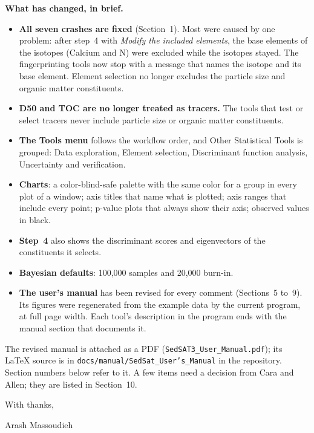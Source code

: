 \documentclass[11pt]{article}
\newcommand{\code}[1]{\texttt{#1}}
\begin{document}
\textbf{What has changed, in brief.}
\begin{itemize}
    \item \textbf{All seven crashes are fixed} (Section~1). Most were caused by
          one problem: after step~4 with \textit{Modify the included elements},
          the base elements of the isotopes (Calcium and N) were excluded while
          the isotopes stayed. The fingerprinting tools now stop with a message
          that names the isotope and its base element. Element selection no
          longer excludes the particle size and organic matter constituents.
    \item \textbf{D50 and TOC are no longer treated as tracers.} The tools that
          test or select tracers never include particle size or organic matter
          constituents.
    \item \textbf{The Tools menu} follows the workflow order, and Other
          Statistical Tools is grouped: Data exploration, Element selection,
          Discriminant function analysis, Uncertainty and verification.
    \item \textbf{Charts}: a color-blind-safe palette with the same color for
          a group in every plot of a window; axis titles that name what is
          plotted; axis ranges that include every point; p-value plots that
          always show their axis; observed values in black.
    \item \textbf{Step~4} also shows the discriminant scores and eigenvectors of
          the constituents it selects.
    \item \textbf{Bayesian defaults}: 100,000 samples and 20,000 burn-in.
    \item \textbf{The user's manual} has been revised for every comment
          (Sections~5 to~9). Its figures were regenerated from the example data
          by the current program, at full page width. Each tool's description in
          the program ends with the manual section that documents it.
\end{itemize}

The revised manual is attached as a PDF (\code{SedSAT3\_User\_Manual.pdf}); its
LaTeX source is in \code{docs/manual/SedSat\_User's\_Manual} in the repository.
Section numbers below refer to it. A few items need a decision from Cara and
Allen; they are listed in Section~10.

With thanks,

Arash Massoudieh

\newpage
\tableofcontents
\newpage
\end{document}

